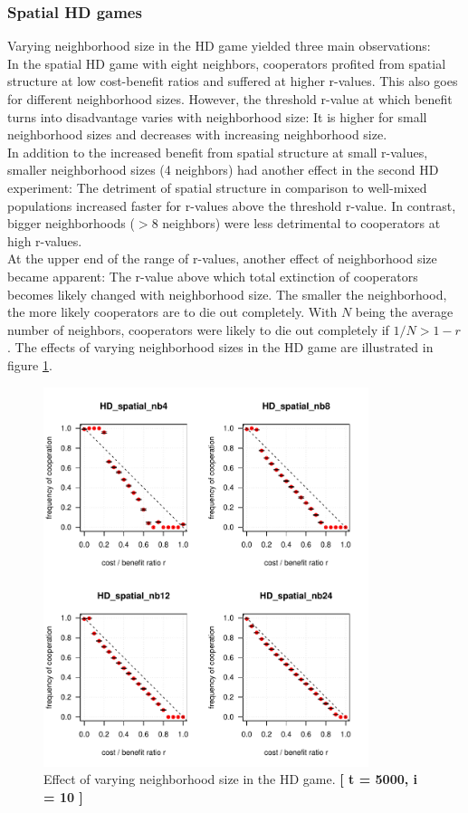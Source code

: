 \subsubsection*{Spatial HD games}
Varying neighborhood size in the HD game yielded three main observations:\\ 
In the spatial HD game with eight neighbors, cooperators profited from spatial structure at low cost-benefit ratios and suffered at higher r-values. This also goes for different neighborhood sizes. However, the threshold r-value at which benefit turns into disadvantage varies with neighborhood size: It is higher for small neighborhood sizes and decreases with increasing neighborhood size.\\
In addition to the increased benefit from spatial structure at small r-values, smaller neighborhood sizes (4 neighbors) had another effect in the second HD experiment: The detriment of spatial structure in comparison to well-mixed populations increased faster for r-values above the threshold r-value. In contrast, bigger neighborhoods ($>8$ neighbors) were less detrimental to cooperators at high r-values.\\
At the upper end of the range of r-values, another effect of neighborhood size became apparent: The r-value above which total extinction of cooperators becomes likely changed with neighborhood size. The smaller the neighborhood, the more likely cooperators are to die out completely. With $N$ being the average number of neighbors, cooperators were likely to die out completely if $1 / N > 1 - r$. The effects of varying neighborhood sizes in the HD game are illustrated in figure \ref{fig: task2_4plot}.\\


\begin{figure}[H]
	\centering 
	\includegraphics[width=9.5cm]{task2_4plot}
	\caption{Effect of varying neighborhood size in the HD game.  \textbf{[ t = 5000, i = 10 ]} }\label{fig: task2_4plot}
\end{figure}




